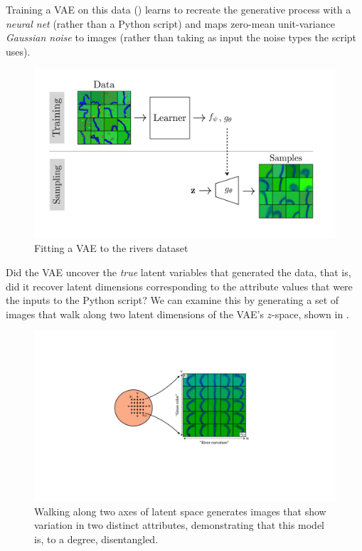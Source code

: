 Training a VAE on this data (\fig{\ref{fig:generative_modeling_and_representation_learning:vae_rivers_samples}}) learns to recreate the generative process with a \textit{neural net} (rather than a Python script) and maps zero-mean unit-variance \textit{Gaussian noise} to images (rather than taking as input the noise types the script uses).
\begin{figure}[h!]
    \centerline{
    \includegraphics[width=1.0\linewidth]{./figures/generative_modeling_and_representation_learning/vae_rivers_samples.pdf}
    }
    \caption{Fitting a VAE to the rivers dataset}
    \label{fig:generative_modeling_and_representation_learning:vae_rivers_samples}
\end{figure}

Did the VAE uncover the \textit{true} latent variables that generated the data, that is, did it recover latent dimensions corresponding to the attribute values that were the inputs to the Python script? We can examine this by generating a set of images that walk along two latent dimensions of the VAE's $z$-space, shown in \fig{\ref{fig:generative_modeling_and_representation_learning:vae_rivers_latent_walk}}.
\begin{figure}[h!]
    \centerline{
    \includegraphics[width=0.75\linewidth]{./figures/generative_modeling_and_representation_learning/vae_rivers_latent_walk.pdf}
    }
    \caption{Walking along two axes of latent space generates images that show variation in two distinct attributes, demonstrating that this model is, to a degree, disentangled.}
    \label{fig:generative_modeling_and_representation_learning:vae_rivers_latent_walk}
\end{figure}

